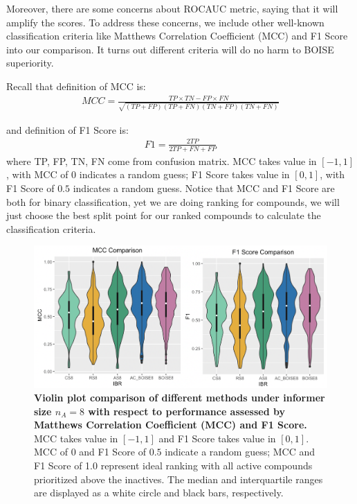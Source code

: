 \documentclass[12pt]{article}
\begin{document}
Moreover, there are some concerns about ROCAUC metric, saying that it will amplify the scores. To address these concerns, we include other well-known classification criteria like Matthews Correlation Coefficient (MCC) and F1 Score into our comparison. It turns out different criteria will do no harm to BOISE superiority. 

Recall that definition of MCC is:
\begin{eqnarray}
\label{eq:mcc}
MCC = \frac{TP\times TN-FP\times FN}{\sqrt{(TP+FP)(TP+FN)(TN+FP)(TN+FN)}}
\end{eqnarray}

and definition of F1 Score is:
\begin{eqnarray}
\label{eq:F1}
F1 = \frac{2TP}{2TP+FN+FP}
\end{eqnarray}
where TP, FP, TN, FN come from confusion matrix. MCC takes value in $[-1,1]$, with MCC of $0$ indicates a random guess; F1 Score takes value in $[0,1]$, with F1 Score of $0.5$ indicates a random guess. Notice that MCC and F1 Score are both for binary classification, yet we are doing ranking for compounds, we will just choose the best split point for our ranked compounds to calculate the classification criteria. 


\begin{figure}[!ht]
\caption{\label{fig:mcc} 
{\bf Violin plot comparison of different methods under informer size $n_A =8$ with respect to performance assessed by Matthews Correlation Coefficient (MCC) and F1 Score.} MCC takes value in $[-1,1]$ and F1 Score takes value in $[0,1]$. MCC of $0$ and F1 Score of $0.5$ indicate a random guess; MCC and F1 Score of 1.0 represent ideal ranking with all active compounds prioritized above the inactives. The median and interquartile ranges are displayed as a white circle and black bars, respectively.} 
\centering
\includegraphics[width=5.0in]{PKIS1_8_mccf1.png}
\end{figure}
\end{document}
